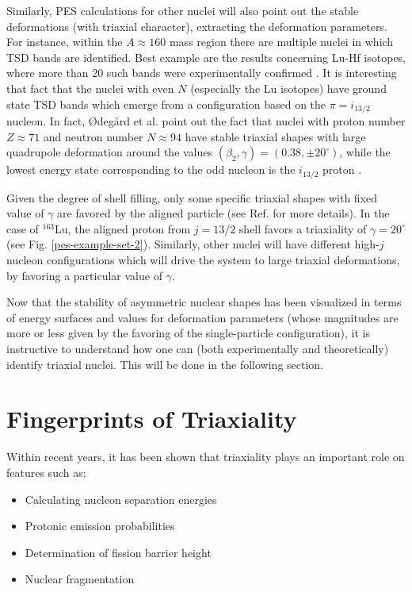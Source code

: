 Similarly, PES calculations for other nuclei will also point out the stable deformations (with triaxial character), extracting the deformation parameters. For instance, within the $A\approx160$ mass region there are multiple nuclei in which TSD bands are identified. Best example are the results concerning Lu-Hf isotopes, where more than 20 such bands were experimentally confirmed \cite{gu2007theoretical}. It is interesting that fact that the nuclei with even $N$ (especially the Lu isotopes) have ground state TSD bands which emerge from a configuration based on the $\pi=i_{13/2}$ nucleon. In fact, Ødegård et al. \cite{odegaard2001evidence} point out the fact that nuclei with proton number $Z\approx 71$ and neutron number $N\approx 94$ have stable triaxial shapes with large quadrupole deformation around the values $(\beta_2,\gamma)=(0.38,\pm 20^\circ)$, while the lowest energy state corresponding to the odd nucleon is the $i_{13/2}$ proton \cite{schnack1995superdeformed}.

Given the degree of shell filling, only some specific triaxial shapes with fixed value of $\gamma$ are favored by the aligned particle (see Ref. \cite{hamamoto1983intrinsic} for more details). In the case of $^{163}$Lu, the aligned proton from $j=13/2$ shell favors a triaxiality of $\gamma=20^\circ$ (see Fig. \ref{pes-example-set-2}). Similarly, other nuclei will have different high-$j$ nucleon configurations which will drive the system to large triaxial deformations, by favoring a particular value of $\gamma$.

Now that the stability of asymmetric nuclear shapes has been visualized in terms of energy surfaces and values for deformation parameters (whose magnitudes are more or less given by the favoring of the single-particle configuration), it is instructive to understand how one can (both experimentally and theoretically) identify triaxial nuclei. This will be done in the following section.

\section{Fingerprints of Triaxiality}

Within recent years, it has been shown that triaxiality plays an important role on features such as:
\begin{itemize}
    \item Calculating nucleon separation energies
    \item Protonic emission probabilities
    \item Determination of fission barrier height
    \item Nuclear fragmentation
\end{itemize}


